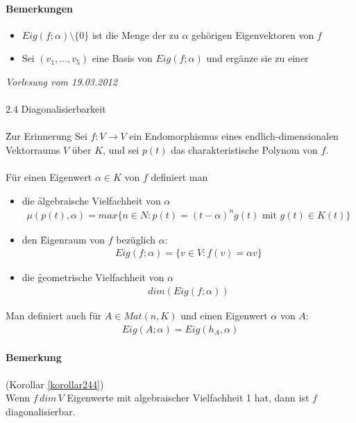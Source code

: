 \paragraph{Bemerkungen}
\begin{itemize}
 \item $Eig(f; \alpha) \setminus \{0\}$ ist die Menge der zu $\alpha$ gehörigen Eigenvektoren von $f$
 \item Sei $(v_1, ..., v_5)$ eine Basis von $Eig(f; \alpha)$ und ergänze sie zu einer  
\end{itemize}


\newpage
\noindent \textit{Vorlesung vom 19.03.2012} \\\\
\Large 2.4 Diagonalisierbarkeit \\\\ \normalsize
\f{Zur Erinnerung}
Sei $f: V \rightarrow V$ ein Endomorphismus eines endlich-dimensionalen Vektorraums $V$ über $K$, und sei $p(t)$ das charakteristische Polynom von $f$. \\\\
Für einen Eigenwert $\alpha \in K$ von $f$ definiert man
\begin{itemize}
\item die \f{algebraische Vielfachheit} von $\alpha$
\begin{align}
\mu(p(t), \alpha) = max \{ n \in N: p(t) = (t-\alpha)^n g(t) \text{ mit } g(t) \in K(t)\}
\end{align}
\item den \f{Eigenraum} von $f$ bezüglich $\alpha$:
\begin{align}
Eig(f; \alpha) = \{v \in V: f(v) = \alpha v\}
\end{align}
\item die \f{geometrische Vielfachheit} von $\alpha$
\begin{align}
dim(Eig(f; \alpha))
\end{align}
\end{itemize}
Man definiert auch für $A \in Mat(n,K)$ und einen Eigenwert $\alpha$ von $A$:
\begin{align}
Eig(A; \alpha) = Eig(h_{A}, \alpha)
\end{align}

\paragraph{Bemerkung} (Korollar \ref{korollar244}) \\
Wenn $f\, dim\, V$ Eigenwerte mit algebraischer Vielfachheit 1 hat, dann ist $f$ diagonalisierbar.

